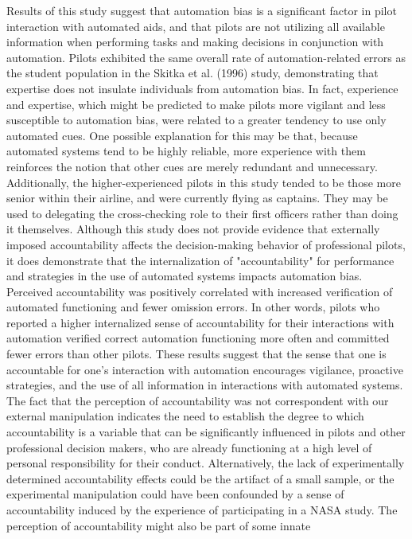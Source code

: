 \documentclass[utf8,bachelor,manualbib]{gradu3}
\begin{document}
Results of this study suggest that automation bias is a significant factor in pilot
interaction with automated aids, and that pilots are not utilizing all available
information when performing tasks and making decisions in conjunction with
automation. Pilots exhibited the same overall rate of automation-related errors as
the student population in the Skitka et al. (1996) study, demonstrating that expertise
does not insulate individuals from automation bias. In fact, experience and expertise,
which might be predicted to make pilots more vigilant and less susceptible to
automation bias, were related to a greater tendency to use only automated cues. One
possible explanation for this may be that, because automated systems tend to be
highly reliable, more experience with them reinforces the notion that other cues are
merely redundant and unnecessary. Additionally, the higher-experienced pilots in
this study tended to be those more senior within their airline, and were currently
flying as captains. They may be used to delegating the cross-checking role to their
first officers rather than doing it themselves.
Although this study does not provide evidence that externally imposed accountability
affects the decision-making behavior of professional pilots, it does demonstrate
that the internalization of "accountability" for performance and strategies in
the use of automated systems impacts automation bias. Perceived accountability
was positively correlated with increased verification of automated functioning and
fewer omission errors. In other words, pilots who reported a higher internalized
sense of accountability for their interactions with automation verified correct
automation functioning more often and committed fewer errors than other pilots.
These results suggest that the sense that one is accountable for one's interaction
with automation encourages vigilance, proactive strategies, and the use of all
information in interactions with automated systems. The fact that the perception of accountability was not correspondent with our external manipulation indicates the
need to establish the degree to which accountability is a variable that can be
significantly influenced in pilots and other professional decision makers, who are
already functioning at a high level of personal responsibility for their conduct.
Alternatively, the lack of experimentally determined accountability effects could
be the artifact of a small sample, or the experimental manipulation could have been
confounded by a sense of accountability induced by the experience of participating
in a NASA study. The perception of accountability might also be part of some innate
\end{document}

